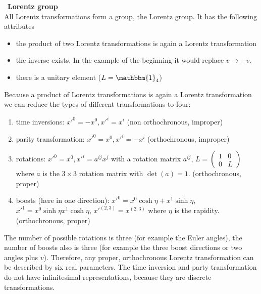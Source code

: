 \documentclass{include/thesisclass}
\newcommand{\df}{\rightarrow}
\newcommand{\ehm}{\mathbbm{1}}
\newcommand{\Matz}[4]{\begin{pmatrix}#1&#2\\#3&#4\end{pmatrix}}
\newcommand{\sub}[1]{~\newline\newline\textbf{#1}\\}
\begin{document}
\sub{Lorentz group}
All Lorentz transformations form a group, the Lorentz group. It has the following attributes
\begin{itemize}
\item the product of two Lorentz transformations is again a Lorentz transformation
\item the inverse exists. In the example of the beginning it would replace $v \df -v$.
\item there is a unitary element ($L = \ehm_4$)
\end{itemize}
Because a product of Lorentz transformations is again a Lorentz transformation we can reduce the types of different transformations to four:
\begin{enumerate}
\item time inversions: $x'^0 = - x^0, x'^i = x^i$ (non orthochronous, improper)
\item parity transformation: $x'^0 = x^0, x'^i = - x^i$ (orthochronous, improper)
\item rotations: $x'^0 = x^0, x'^i = a^{ij} x^j$ with a rotation matrix $a^{ij}$, $L = \Matz{1}{0}{0}{L}$ where $a$ is the $3\times 3$ rotation matrix with $\det(a) = 1$. (orthochronous, proper)
\item boosts (here in one direction): $x'^0 = x^0 \cosh \eta + x^1 \sinh \eta$, $x'^1 = x^0 \sinh\eta x^1 \cosh\eta$, $x'^{(2,3)} = x^{(2,3)}$ where $\eta$ is the rapidity. (orthochronous, proper)
\end{enumerate}
The number of possible rotations is three (for example the Euler angles), the number of boosts also is three (for example the three boost directions or two angles plus $v$). Therefore, any proper, orthochronous Lorentz transformation can be described by six real parameters. The time inversion and party transformation do not have infinitesimal representations, because they are discrete transformations.
\end{document}
